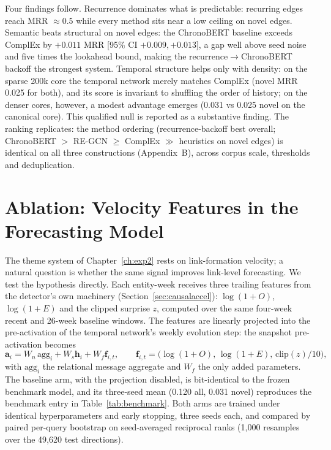 \documentclass[a4paper,12pt]{report}
\begin{document}
Four findings follow. Recurrence dominates what is predictable:
recurring edges reach MRR $\approx 0.5$ while every method sits near a low
ceiling on novel edges. Semantic beats structural on novel edges: the
ChronoBERT baseline exceeds ComplEx by $+0.011$ MRR
[95\% CI $+0.009, +0.013$], a gap well above seed noise and five times the
lookahead bound, making the recurrence$\rightarrow$ChronoBERT backoff
the strongest system. Temporal structure helps only with density: on
the sparse 200k core the temporal network merely matches ComplEx (novel MRR
0.025 for both), and its score is invariant to shuffling the order of history;
on the denser cores, however, a modest advantage emerges (0.031 vs 0.025 novel
on the canonical core). This qualified null is reported as a substantive
finding. The ranking replicates: the method ordering
(recurrence-backoff best overall; ChronoBERT $>$ RE-GCN $\geq$ ComplEx $\gg$
heuristics on novel edges) is identical on all three constructions
(Appendix~B), across corpus scale, thresholds and deduplication.

\section{Ablation: Velocity Features in the Forecasting Model}
\label{sec:velablation}
The theme system of Chapter~\ref{ch:exp2} rests on link-formation velocity;
a natural question is whether the same signal improves link-level
forecasting. We test the hypothesis directly. Each entity-week receives
three trailing features from the detector's own machinery
(Section~\ref{sec:causalaccel}): $\log(1+O)$, $\log(1+E)$ and the clipped
surprise $z$, computed over the same four-week recent and 26-week baseline
windows. The features are linearly projected into the pre-activation of the
temporal network's weekly evolution step: the snapshot pre-activation
becomes
\begin{equation}
\mathbf{a}_i = W_n\, \mathrm{agg}_i + W_s \mathbf{h}_i + W_f
\mathbf{f}_{i,t}, \qquad
\mathbf{f}_{i,t} = \bigl( \log(1+O),\, \log(1+E),\, \mathrm{clip}(z)/10
\bigr),
\label{eq:velinject}
\end{equation}
with $\mathrm{agg}_i$ the relational message aggregate and $W_f$ the only
added parameters. The baseline arm, with the
projection disabled, is bit-identical to the frozen benchmark model, and its
three-seed mean (0.120 all, 0.031 novel) reproduces the benchmark entry in
Table~\ref{tab:benchmark}. Both arms are trained under identical
hyperparameters and early stopping, three seeds each, and compared by paired
per-query bootstrap on seed-averaged reciprocal ranks (1{,}000 resamples
over the 49{,}620 test directions).
\end{document}
